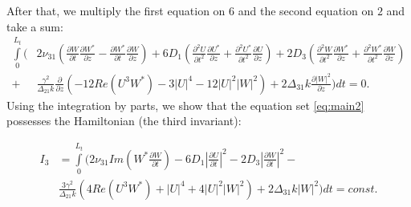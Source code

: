 \documentclass[a4paper, 12pt, onecolumn]{extarticle}
\begin{document}
After that, we multiply the first equation on \(6\) and the second equation on \(2\) and take a sum:
\[
\begin{aligned}
\int\limits_0^{L_t}\Big(&2\nu_{31}\left(\frac{\partial W}{\partial t}\frac{\partial W^*}{\partial z}-\frac{\partial W^*}{\partial t}\frac{\partial W}{\partial z}\right)+6D_1\left(\frac{\partial^2 U}{\partial t^2}\frac{\partial U^*}{\partial z}+\frac{\partial^2 U^*}{\partial t^2}\frac{\partial U}{\partial z}\right)+2D_3\left(\frac{\partial^2 W}{\partial t^2}\frac{\partial W^*}{\partial z}+\frac{\partial^2 W^*}{\partial t^2}\frac{\partial W}{\partial z}\right)\\
+&\frac{\gamma^2}{\Delta_{21}k}\frac{\partial}{\partial z}\left(-12Re(U^3W^*)-3|U|^4-12|U|^2|W|^2\right)+2\Delta_{31}k\frac{\partial |W|^2}{\partial z}\Big)dt=0.
\end{aligned}
\]
Using the integration by parts, we show that the equation set \eqref{eq:main2} possesses the Hamiltonian (the third invariant):

\begin{equation}
\label{eq:ninv3}
\begin{aligned}
I_3&=\int\limits_0^{L_t}\Big(2\nu_{31}Im\left(W^*\frac{\partial W}{\partial t}\right)-6D_1|\frac{\partial U}{\partial t}|^2-2D_3|\frac{\partial W}{\partial t}|^2-\\
&\frac{3\gamma^2}{\Delta_{21}k}\left(4Re(U^3W^*)+|U|^4+4|U|^2|W|^2\right)+2\Delta_{31}k|W|^2\Big)dt=const.
\end{aligned}
\end{equation}
\end{document}
